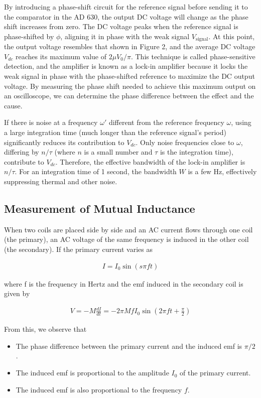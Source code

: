 By introducing a phase-shift circuit for the reference signal before sending it to the comparator in
the AD 630, the output DC voltage will change as
the phase shift increases from zero. The DC voltage
peaks when the reference signal is phase-shifted by $\phi$,
aligning it in phase with the weak signal $V_\text{signal}$. At
this point, the output voltage resembles that shown
in Figure 2, and the average DC voltage $V_{dc}$ reaches
its maximum value of $2\mu V_0/\pi$. This technique is called
phase-sensitive detection, and the amplifier is known
as a lock-in amplifier because it locks the weak signal
in phase with the phase-shifted reference to maximize the DC output voltage.
By measuring the
phase shift needed to achieve this maximum output
on an oscilloscope, we can determine the phase difference between the effect and the cause.

If there is noise at a frequency $\omega'$ different from
the reference frequency $\omega$, using a large integration
time (much longer than the reference signal’s period)
significantly reduces its contribution to $V_{dc}$. Only
noise frequencies close to $\omega$, differing by $n/\tau$ (where
$n$ is a small number and $\tau$ is the integration time),
contribute to $V_{dc}$.
Therefore, the effective bandwidth of the lock-in amplifier is $n/\tau$. For an integration time of 1 second, the bandwidth $W$ is a few Hz,
effectively suppressing thermal and other noise.

\subsection*{Measurement of Mutual Inductance}
When two coils are placed side by side and an AC
current flows through one coil (the primary), an AC
voltage of the same frequency is induced in the other
coil (the secondary). If the primary current varies as

\begin{align}
    I = I_0 \sin(s\pi ft)
\end{align}

where f is the frequency in Hertz and the emf induced
in the secondary coil is given by

\begin{align}
    V = -M \frac{dI}{dt} = -2\pi MfI_0 \sin\left(2\pi ft + \frac{\pi}{2}\right)
\end{align}

From this, we observe that

\begin{itemize}
    \item The phase difference between the primary current and the induced emf is $\pi/2$.
    \item The induced emf is proportional to the amplitude $I_0$ of the primary current.
    \item The induced emf is also proportional to the frequency $f$.\\
\end{itemize}

